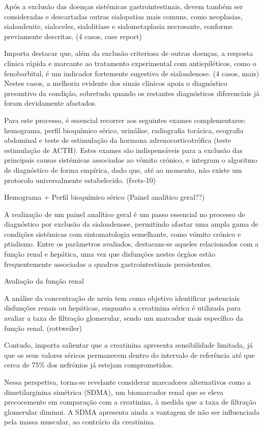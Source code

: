 Após a exclusão das doenças sistémicas gastrointestinais, devem também ser consideradas e descartadas outras sialopatias mais comuns, como neoplasias, sialoadenite, sialoceles, sialolitíase e sialometaplasia necrosante, conforme previamente descritas. (4 casos, case report) 


Importa destacar que, além da exclusão criteriosa de outras doenças, a resposta clínica rápida e marcante ao tratamento experimental com antiepiléticos, como o fenobarbital, é um indicador fortemente sugestivo de sialoadenose. (4 casos, mais) Nestes casos, a melhoria evidente dos sinais clínicos apoia o diagnóstico presuntivo da condição, sobretudo quando os restantes diagnósticos diferenciais já foram devidamente afastados.


Para este processo, é essencial recorrer aos seguintes exames complementares: hemograma, perfil bioquímico sérico, urinálise, radiografia torácica, ecografia abdominal e teste de estimulação da hormona adrenocorticotrófica (teste estimulação de ACTH). Estes exames são indispensáveis para a exclusão das principais causas sistémicas associadas ao vómito crónico, e integram o algoritmo de diagnóstico de forma empírica, dado que, até ao momento, não existe um protocolo universalmente estabelecido. (fvets-10)


Hemograma + Perfil bioquímico sérico (Painel analítico geral??)


A realização de um painel analítico geral é um passo essencial no processo de diagnóstico por exclusão da sialoadenose, permitindo afastar uma ampla gama de condições sistémicas com sintomatologia semelhante, como vómito crónico e ptialismo. Entre os parâmetros avaliados, destacam-se aqueles relacionados com a função renal e hepática, uma vez que disfunções nestes órgãos estão frequentemente associadas a quadros gastrointestinais persistentes.

Avaliação da função renal

A análise da concentração de ureia tem como objetivo identificar potenciais disfunções renais ou hepáticas, enquanto a creatinina sérica é utilizada para avaliar a taxa de filtração glomerular, sendo um marcador mais específico da função renal. (rottweiler) 


Contudo, importa salientar que a creatinina apresenta sensibilidade limitada, já que os seus valores séricos permanecem dentro do intervalo de referência até que cerca de 75\% dos nefrónios já estejam comprometidos. \cite{Kovarikova2015}


Nessa perspetiva, torna-se revelante considerar marcadores alternativos como a dimetilarginina simétrica (SDMA), um biomarcador renal que se eleva precocemente em comparação com a creatinina, à medida que a taxa de filtração glomerular diminui. \cite{Gori2020} A SDMA apresenta ainda a vantagem de não ser influenciada pela massa muscular, ao contrário da creatinina. \cite{sdma}


